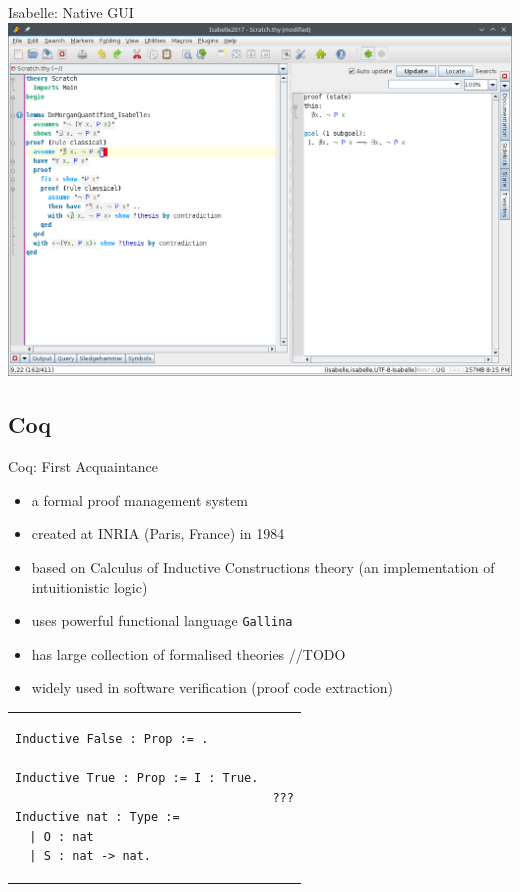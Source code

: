 \documentclass[aspectratio=169, fleqn]{beamer}
\begin{document}
\begin{frame}{Isabelle: Native GUI}
\includegraphics[scale=0.38]{img/isabelle.png}
\end{frame}



\subsection{Coq}


\begin{frame}[fragile]{Coq: First Acquaintance}

\vspace{10pt}
\begin{itemize}
  \item a formal proof management system
  \item created at INRIA (Paris, France) in 1984
  \item based on Calculus of Inductive Constructions theory (an implementation of intuitionistic logic)
  \item \textcolor{dkgray}{ uses powerful functional language \texttt{Gallina} }
  \item \textcolor{dkgray}{ has large collection of formalised theories  //TODO }
  \item \textcolor{dkgray}{ widely used in software verification (proof code extraction) }
\end{itemize}

\begin{tabular}{p{.45\linewidth} p{.45\linewidth}}
  \begin{lstlisting}[language=coq, caption={Definition of basic datatypes 
  %in Isabelle:
  }]
Inductive False : Prop := .

Inductive True : Prop := I : True.

Inductive nat : Type :=
  | O : nat
  | S : nat -> nat.
\end{lstlisting}
  &
  
  \begin{lstlisting}[language=isabelle,caption={???}]
  ???
  \end{lstlisting}
\end{tabular}

\end{frame}
\end{document}
